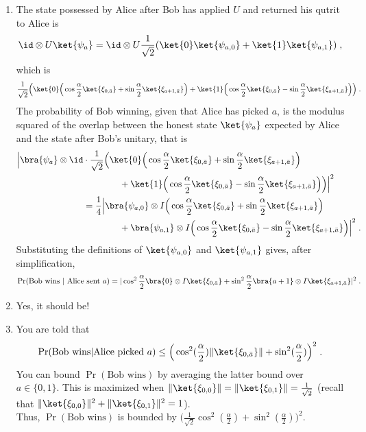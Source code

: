 \begin{exercises}
\begin{enumerate}
\item The state possessed by Alice after Bob has applied $U$ and returned his qutrit to Alice is
\begin{equation*}
\id\otimes U \ket{\psi_a} = \id\otimes U \frac{1}{\sqrt{2}}(\ket{0} \ket{\psi_{a,0}} + \ket{1} \ket{\psi_{a,1}} )\;,
\end{equation*}
which is
\begin{equation*}
\frac{1}{\sqrt{2}} \Big( \ket{0}\Big(\cos\frac{\alpha}{2} \ket{\xi_{0, \bar{a}}} + \sin\frac{\alpha}{2} \ket{\xi_{a+1, \bar{a}}}\Big) + \ket{1}\Big(\cos\frac{\alpha}{2} \ket{\xi_{0, \bar{a}}} - \sin\frac{\alpha}{2} \ket{\xi_{a+1, \bar{a}}}\Big)\Big)\;.
\end{equation*}
The probability of Bob winning, given that Alice has picked $a$, is the modulus squared of the overlap between the honest state $\ket{\psi_a}$ expected by Alice and the state after Bob's unitary, that is
\begin{align*}
\Big|\bra{\psi_a} \otimes \id  &\cdot \frac{1}{\sqrt{2}} \Big( \ket{0}\Big(\cos\frac{\alpha}{2} \ket{\xi_{0, \bar{a}}} + \sin\frac{\alpha}{2} \ket{\xi_{a+1, \bar{a}}}\Big)\\
& \qquad\qquad+ \ket{1}\Big(\cos\frac{\alpha}{2} \ket{\xi_{0, \bar{a}}} - \sin\frac{\alpha}{2} \ket{\xi_{a+1, \bar{a}}}\Big)\Big) \Big|^2 \\
&= \frac14 \Big|\bra{\psi_{a,0}}\otimes I \Big(\cos\frac{\alpha}{2} \ket{\xi_{0, \bar{a}}} + \sin\frac{\alpha}{2} \ket{\xi_{a+1, \bar{a}}}\Big) \\
&\qquad\qquad+ \bra{\psi_{a,1}} \otimes I \Big(\cos\frac{\alpha}{2} \ket{\xi_{0, \bar{a}}} - \sin\frac{\alpha}{2} \ket{\xi_{a+1, \bar{a}}}\Big) \Big|^2\;.
\end{align*}
Substituting the definitions of $\ket{\psi_{a,0}}$ and $\ket{\psi_{a,1}}$ gives, after simplification,
\begin{equation*}
\Pr(\mbox{Bob wins $|$ Alice sent $a$} ) =| \cos^2\frac{\alpha}{2} \bra{0}\otimes I \ket{\xi_{0,\bar{a}}} + \sin^2\frac{\alpha}{2} \bra{a+1} \otimes I \ket{\xi_{a+1,\bar{a}}}|^2\;.
\end{equation*}

\item Yes, it should be!

\item You are told that 
\[\Pr(\mbox{Bob wins} | \mbox{Alice picked $a$}) \leq \Big(\cos^2(\frac{\alpha}{2}) \|\ket{\xi_{0,\bar{a}}}\| + \sin^2(\frac{\alpha}{2})\Big)^2\;.\]
You can bound $\Pr(\mbox{Bob wins})$ by averaging the latter bound over $a \in \{0,1\}$. This is maximized when $\|\ket{\xi_{0,0}}\| = \|\ket{\xi_{0,1}}\| = \frac{1}{\sqrt{2}}$ (recall that $\|\ket{\xi_{0,0}}\|^2 + \|\ket{\xi_{0,1}}\|^2 = 1$). \\
Thus, $\Pr(\mbox{Bob wins})$ is bounded by $\Big( \frac{1}{\sqrt{2}}\cos^2(\frac{\alpha}{2}) +\sin^2(\frac{\alpha}{2})\Big)^2$.


\end{enumerate}
\end{exercises}
